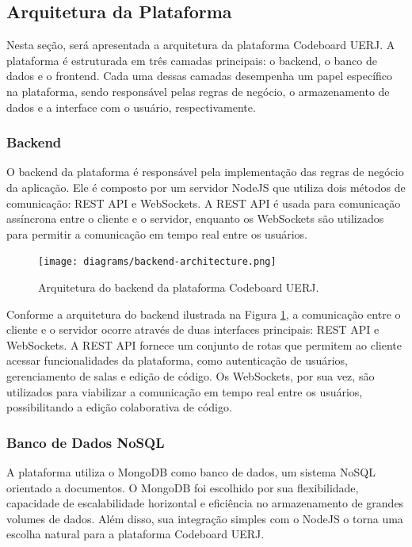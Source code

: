 \subsection{Arquitetura da Plataforma}

Nesta seção, será apresentada a arquitetura da plataforma Codeboard UERJ. A plataforma é estruturada em três camadas principais: o backend, o banco de dados e o frontend. Cada uma dessas camadas desempenha um papel específico na plataforma, sendo responsável pelas regras de negócio, o armazenamento de dados e a interface com o usuário, respectivamente.

\subsubsection{Backend}

O backend da plataforma é responsável pela implementação das regras de negócio da aplicação. Ele é composto por um servidor NodeJS que utiliza dois métodos de comunicação: REST API e WebSockets. A REST API é usada para comunicação assíncrona entre o cliente e o servidor, enquanto os WebSockets são utilizados para permitir a comunicação em tempo real entre os usuários.

\begin{figure}[H]
    \centering
    \texttt{[image: diagrams/backend-architecture.png]}
    \caption{Arquitetura do backend da plataforma Codeboard UERJ.}
    \label{fig:backend-architecture}
\end{figure}

Conforme a arquitetura do backend ilustrada na Figura \ref{fig:backend-architecture}, a comunicação entre o cliente e o servidor ocorre através de duas interfaces principais: REST API e WebSockets. A REST API fornece um conjunto de rotas que permitem ao cliente acessar funcionalidades da plataforma, como autenticação de usuários, gerenciamento de salas e edição de código. Os WebSockets, por sua vez, são utilizados para viabilizar a comunicação em tempo real entre os usuários, possibilitando a edição colaborativa de código.


\subsubsection{Banco de Dados NoSQL}

A plataforma utiliza o MongoDB como banco de dados, um sistema NoSQL orientado a documentos. O MongoDB foi escolhido por sua flexibilidade, capacidade de escalabilidade horizontal e eficiência no armazenamento de grandes volumes de dados. Além disso, sua integração simples com o NodeJS o torna uma escolha natural para a plataforma Codeboard UERJ.

